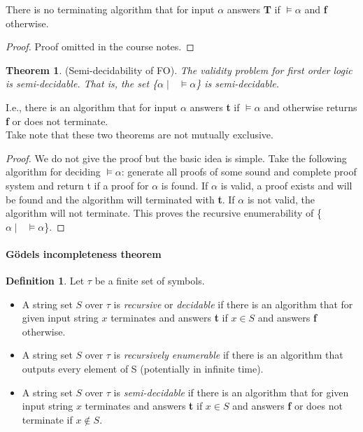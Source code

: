 \documentclass[10pt,a4paper]{article}
\theoremstyle{definition}
\newtheorem{definition}{Definition}[section]
\newtheorem{theorem}{Theorem}
\begin{document}
There is no terminating algorithm that for input $\alpha$ answers \textbf{T} if $\models\alpha$ and \textbf{f} otherwise.


\begin{proof}
Proof omitted in the course notes.
\end{proof}

\begin{theorem}
(Semi-decidability of FO). \textit{The validity problem for first order logic is semi-decidable. That is, the set \{$\alpha \mid \text{ } \models \alpha$\} is semi-decidable.}
\end{theorem}

I.e., there is an algorithm that for input $\alpha$ answers \textbf{t} if $\models\alpha$ and otherwise returns \textbf{f} or does not
terminate. \\

Take note that these two theorems are not mutually exclusive.

\begin{proof}
We do not give the proof but the basic idea is simple. Take the following algorithm for deciding $\models\alpha$: generate all proofs of some sound and complete proof system and return t if a proof for $\alpha$ is found. If $\alpha$ is valid, a proof exists and will be found and the algorithm will terminated with \textbf{t}. If $\alpha$ is not valid, the algorithm will not terminate. This proves the recursive
enumerability of \{$\alpha \mid \text{ } \models \alpha$\}.
\end{proof}

\paragraph{G\"{o}dels incompleteness theorem}

\begin{definition}
Let $\tau$ be a finite set of symbols.

\begin{itemize}
	\item A string set $S$ over $\tau$ is \textit{recursive} or \textit{decidable} if there is an algorithm that for given input string $x$ terminates and answers \textbf{t} if $x \in S$ and answers \textbf{f} otherwise.
	\item A string set $S$ over $\tau$ is \textit{recursively enumerable} if there is an algorithm that outputs every element of S (potentially in infinite time).
	\item A string set $S$ over $\tau$ is \textit{semi-decidable} if there is an algorithm that for given input string $x$ terminates and answers \textbf{t} if $x \in S$ and answers \textbf{f} or does not terminate if $x\not\in S$.
\end{itemize}
\end{definition}
\end{document}
